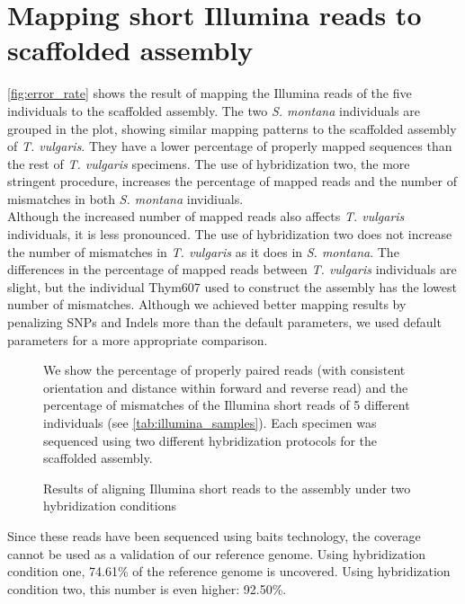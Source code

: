 \section{Mapping short Illumina reads to scaffolded assembly}

\autoref{fig:error_rate} shows the result of mapping the Illumina reads of the five individuals to the scaffolded assembly. The two \textit{S. montana} individuals are grouped in the plot, showing similar mapping patterns to the scaffolded assembly of \textit{T. vulgaris}. They have a lower percentage of properly mapped sequences than the rest of \textit{T. vulgaris} specimens. The use of hybridization two, the more stringent procedure, increases the percentage of mapped reads and the number of mismatches in both \textit{S. montana} invidiuals.\\

Although the increased number of mapped reads also affects \textit{T. vulgaris} individuals, it is less pronounced. The use of hybridization two does not increase the number of mismatches in \textit{T. vulgaris} as it does in \textit{S. montana}. The differences in the percentage of mapped reads between \textit{T. vulgaris} individuals are slight, but the individual Thym607 used to construct the assembly has the lowest number of mismatches. Although we achieved better mapping results by penalizing SNPs and Indels more than the default parameters, we used default parameters for a more appropriate comparison.\\



\begin{figure}
    \centering
    \def\svgwidth{\textwidth}
    
    \caption{Results of aligning Illumina short reads to the assembly under two hybridization conditions}
    \small
    We show the percentage of properly paired reads (with consistent orientation and distance within forward and reverse read) and the percentage of mismatches of the Illumina short reads of 5 different individuals (see \autoref{tab:illumina_samples}). Each specimen was sequenced using two different hybridization protocols for the scaffolded assembly.     
    \label{fig:error_rate}
\end{figure}   

Since these reads have been sequenced using baits technology, the coverage cannot be used as a validation of our reference genome. Using hybridization condition one, 74.61\% of the reference genome is uncovered. Using hybridization condition two, this number is even higher: 92.50\%. 